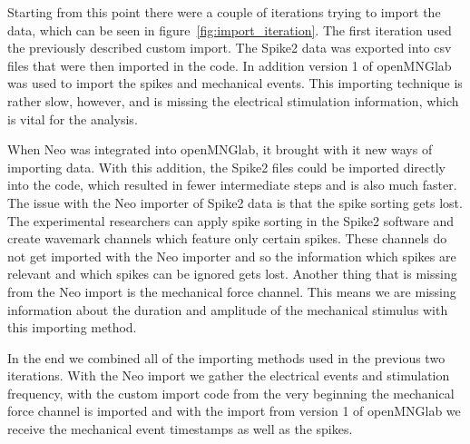 Starting from this point there were a couple of iterations trying to import the data, which can be seen in figure~\ref{fig:import_iteration}. The first iteration used the previously described custom import. The Spike2 data was exported into csv files that were then imported in the code. In addition version 1 of openMNGlab was used to import the spikes and mechanical events. This importing technique is rather slow, however, and is missing the electrical stimulation information, which is vital for the analysis.

When Neo was integrated into openMNGlab, it brought with it new ways of importing data. With this addition, the Spike2 files could be imported directly into the code, which resulted in fewer intermediate steps and is also much faster. The issue with the Neo importer of Spike2 data is that the spike sorting gets lost. The experimental researchers can apply spike sorting in the Spike2 software and create wavemark channels which feature only certain spikes. These channels do not get imported with the Neo importer and so the information which spikes are relevant and which spikes can be ignored gets lost. Another thing that is missing from the Neo import is the mechanical force channel. This means we are missing information about the duration and amplitude of the mechanical stimulus with this importing method.

In the end we combined all of the importing methods used in the previous two iterations. With the Neo import we gather the electrical events and stimulation frequency, with the custom import code from the very beginning the mechanical force channel is imported and with the import from version 1 of openMNGlab we receive the mechanical event timestamps as well as the spikes.

